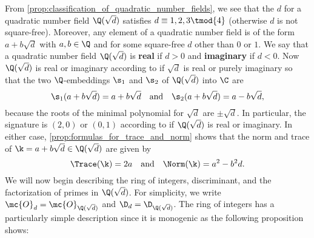     From \cref{prop:classification_of_quadratic_number_fields}, we see that the $d$ for a quadratic number field $\Q(\sqrt{d})$ satisfies $d \equiv 1,2,3 \tmod{4}$ (otherwise $d$ is not square-free). Moreover, any element of a quadratic number field is of the form $a+b\sqrt{d}$ with $a,b \in \Q$ and for some square-free $d$ other than $0$ or $1$. We say that a quadratic number field $\Q(\sqrt{d})$ is \textbf{real} if $d > 0$ and \textbf{imaginary} if $d < 0$. Now $\Q(\sqrt{d})$ is real or imaginary according to if $\sqrt{d}$ is real or purely imaginary so that the two $\Q$-embeddings $\s_{1}$ and $\s_{2}$ of $\Q(\sqrt{d})$ into $\C$ are
    \[
      \s_{1}(a+b\sqrt{d}) = a+b\sqrt{d} \quad \text{and} \quad \s_{2}(a+b\sqrt{d}) = a-b\sqrt{d},
    \]
    because the roots of the minimal polynomial for $\sqrt{d}$ are $\pm\sqrt{d}$. In particular, the signature is $(2,0)$ or $(0,1)$ according to if $\Q(\sqrt{d})$ is real or imaginary. In either case, \cref{prop:formulas_for_trace_and_norm} shows that the norm and trace of $\k = a+b\sqrt{d} \in \Q(\sqrt{d})$ are given by
    \[
      \Trace(\k) = 2a \quad \text{and} \quad \Norm(\k) = a^{2}-b^{2}d.
    \]
    We will now begin describing the ring of integers, discriminant, and the factorization of primes in $\Q(\sqrt{d})$. For simplicity, we write $\mc{O}_{d} = \mc{O}_{\Q(\sqrt{d})}$ and $\D_{d} = \D_{\Q(\sqrt{d})}$. The ring of integers has a particularly simple description since it is monogenic as the following proposition shows:
    

